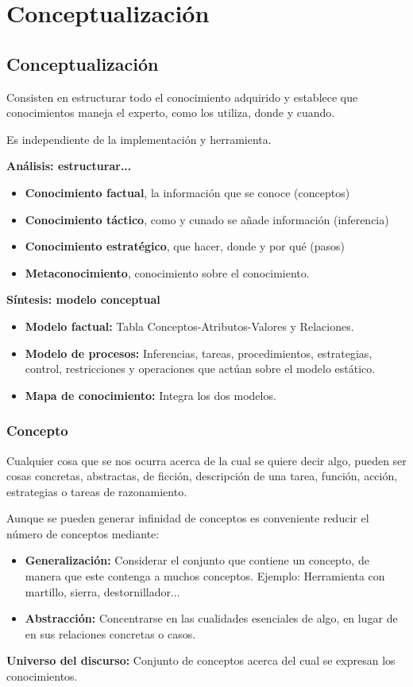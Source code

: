\documentclass[12pt, twoside, openright]{report} %
\begin{document}
\chapter{Conceptualización}
\section{Conceptualización}
Consisten en estructurar todo el conocimiento adquirido y establece que conocimientos maneja el experto, como los utiliza, donde y cuando. 

Es independiente de la implementación y herramienta.

\textbf{Análisis: estructurar...}
\begin{itemize}
	\item \textbf{Conocimiento factual}, la información que se conoce (conceptos)
	\item \textbf{Conocimiento táctico}, como y cunado se añade información (inferencia)
	\item \textbf{Conocimiento estratégico}, que hacer, donde y por qué (pasos)
	\item \textbf{Metaconocimiento}, conocimiento sobre el conocimiento.
\end{itemize}
\textbf{Síntesis: modelo conceptual}
\begin{itemize}
	\item \textbf{Modelo factual:} Tabla Conceptos-Atributos-Valores y Relaciones.
	\item \textbf{Modelo de procesos:} Inferencias, tareas, procedimientos, estrategias, control, restricciones y operaciones que actúan sobre el modelo estático.
	\item \textbf{Mapa de conocimiento:} Integra los dos modelos.
\end{itemize}

\subsection{Concepto}
Cualquier cosa que se nos ocurra acerca de la cual se quiere decir algo, pueden ser cosas concretas, abstractas, de ficción, descripción de una tarea, función, acción, estrategias o tareas de razonamiento.

Aunque se pueden generar infinidad de conceptos es conveniente reducir el número de conceptos mediante:
\begin{itemize}
	\item \textbf{Generalización:} Considerar el conjunto que contiene un concepto, de manera que este contenga a muchos conceptos. Ejemplo: Herramienta con martillo, sierra, destornillador...
	\item \textbf{Abstracción:} Concentrarse en las cualidades esenciales de algo, en lugar de en sus relaciones concretas o casos.
\end{itemize}
\textbf{Universo del discurso:} Conjunto de conceptos acerca del cual se expresan los conocimientos.
\end{document}
